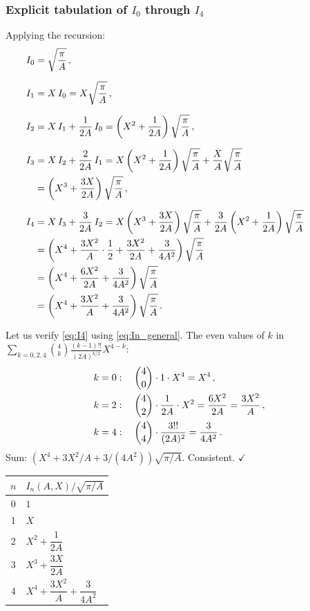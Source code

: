 \subsubsection{Explicit tabulation of $I_0$ through $I_4$}

Applying the recursion:
\begin{alignat}{2}
  I_0 &= \sqrt{\frac{\pi}{A}}\,, &\qquad& \label{eq:I0}\\[6pt]
  I_1 &= X\,I_0 = X\sqrt{\frac{\pi}{A}}\,, && \label{eq:I1}\\[6pt]
  I_2 &= X\,I_1 + \frac{1}{2A}\,I_0
       = \left(X^2 + \frac{1}{2A}\right)\sqrt{\frac{\pi}{A}}\,, && \label{eq:I2}\\[6pt]
  I_3 &= X\,I_2 + \frac{2}{2A}\,I_1
       = X\left(X^2 + \frac{1}{2A}\right)\sqrt{\frac{\pi}{A}} + \frac{X}{A}\sqrt{\frac{\pi}{A}}\notag\\
      &= \left(X^3 + \frac{3X}{2A}\right)\sqrt{\frac{\pi}{A}}\,, && \label{eq:I3}\\[6pt]
  I_4 &= X\,I_3 + \frac{3}{2A}\,I_2
       = X\left(X^3 + \frac{3X}{2A}\right)\sqrt{\frac{\pi}{A}} + \frac{3}{2A}\left(X^2+\frac{1}{2A}\right)\sqrt{\frac{\pi}{A}}\notag\\
      &= \left(X^4 + \frac{3X^2}{A}\cdot\frac{1}{2}+\frac{3X^2}{2A}+\frac{3}{4A^2}\right)\sqrt{\frac{\pi}{A}}\notag\\
      &= \left(X^4 + \frac{6X^2}{2A} + \frac{3}{4A^2}\right)\sqrt{\frac{\pi}{A}}\notag\\
      &= \left(X^4 + \frac{3X^2}{A} + \frac{3}{4A^2}\right)\sqrt{\frac{\pi}{A}}\,. && \label{eq:I4}
\end{alignat}

Let us verify \cref{eq:I4} using \cref{eq:In_general}. The even values of $k$ in $\sum_{k=0,2,4}\binom{4}{k}\frac{(k-1)!!}{(2A)^{k/2}}X^{4-k}$:
\begin{align}
  k=0&:\quad \binom{4}{0}\cdot 1 \cdot X^4 = X^4\,,\notag\\
  k=2&:\quad \binom{4}{2}\cdot\frac{1}{2A}\cdot X^2 = \frac{6X^2}{2A} = \frac{3X^2}{A}\,,\notag\\
  k=4&:\quad \binom{4}{4}\cdot\frac{3!!}{(2A)^2} = \frac{3}{4A^2}\,.
\end{align}
Sum: $(X^4 + 3X^2/A + 3/(4A^2))\sqrt{\pi/A}$. Consistent. $\checkmark$

\begin{center}
\renewcommand{\arraystretch}{1.8}
\begin{tabular}{cl}
  \toprule
  $n$ & $I_n(A,X) / \sqrt{\pi/A}$ \\
  \midrule
  0 & $1$ \\
  1 & $X$ \\
  2 & $X^2 + \dfrac{1}{2A}$ \\
  3 & $X^3 + \dfrac{3X}{2A}$ \\
  4 & $X^4 + \dfrac{3X^2}{A} + \dfrac{3}{4A^2}$ \\
  \bottomrule
\end{tabular}
\end{center}

